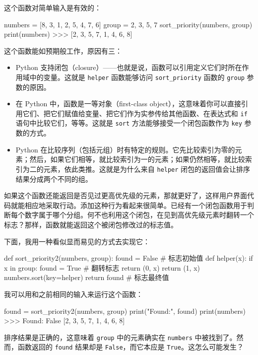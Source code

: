 这个函数对简单输入是有效的：

\begin{codebox}[python]
numbers = [8, 3, 1, 2, 5, 4, 7, 6]
group = {2, 3, 5, 7}
sort_priority(numbers, group)
print(numbers)
>>>
[2, 3, 5, 7, 1, 4, 6, 8]
\end{codebox}

这个函数能如预期般工作，原因有三：

\begin{itemize}
\item Python 支持闭包（closure）——也就是说，函数可以引用定义它们时所在作用域中的变量。这就是 \texttt{helper} 函数能够访问 \texttt{sort\_priority} 函数的 \texttt{group} 参数的原因。
\item 在 Python 中，函数是一等对象（first-class object），这意味着你可以直接引用它们、把它们赋值给变量、把它们作为实参传给其他函数、在表达式和 \texttt{if} 语句中比较它们，等等。这就是 \texttt{sort} 方法能够接受一个闭包函数作为 \texttt{key} 参数的方式。
\item Python 在比较序列（包括元组）时有特定的规则。它先比较索引为零的元素；然后，如果它们相等，就比较索引为一的元素；如果仍然相等，就比较索引为二的元素，依此类推。这就是为什么来自 \texttt{helper} 闭包的返回值会让排序结果分成两个不同的组。
\end{itemize}

如果这个函数还能返回是否见过更高优先级的元素，那就更好了，这样用户界面代码就能相应地采取行动。添加这种行为看起来很简单。已经有一个闭包函数用于判断每个数字属于哪个分组。何不也利用这个闭包，在见到高优先级元素时翻转一个标志？那样，函数就能返回这个被闭包修改过的标志值。

下面，我用一种看似显而易见的方式去实现它：

\begin{codebox}[python]
def sort_priority2(numbers, group):
    found = False         # 标志初始值
    def helper(x):
        if x in group:
            found = True  # 翻转标志
            return (0, x)
        return (1, x)
    numbers.sort(key=helper)
    return found          # 标志最终值
\end{codebox}

我可以用和之前相同的输入来运行这个函数：

\begin{codebox}[python]
found = sort_priority2(numbers, group)
print("Found:", found)
print(numbers)
>>>
Found: False
[2, 3, 5, 7, 1, 4, 6, 8]
\end{codebox}

排序结果是正确的，这意味着 \texttt{group} 中的元素确实在 \texttt{numbers} 中被找到了。然而，函数返回的 \texttt{found} 结果却是 \texttt{False}，而它本应是 \texttt{True}。这怎么可能发生？

